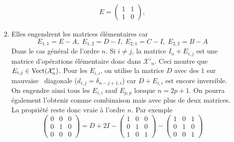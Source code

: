 \begin{enumerate}
\begin{enumerate}
\begin{multline*}
E=
\begin{pmatrix}
1 & 1 \\ 1 & 0  
\end{pmatrix},
\end{multline*}
  \item Elles engendrent les matrices élémentaires car
\begin{displaymath}
E_{1,1}=E-A, \;E_{1,2}=D-I, \;E_{2,1}=C-I, \;E_{2,2}=B-A   
\end{displaymath}
Dans le cas général de l'ordre $n$. Si $i\neq j$, la matrice $I_n + E_{i,j}$ est une matrice d'opérations élémentaire donc dans $\mathcal{X}'_n$. Ceci montre que $E_{i,j}\in \operatorname{Vect}(\mathcal{X}'_n)$.
Pour les $E_{i,i}$, on utilise la matrice $D$ avec des $1$ sur \og mauvaise\fg~ diagonale ($d_{i,j}=\delta _{n-j+1,i}$) car $D+E_{i,i}$ est encore inversible. On engendre ainsi tous les $E_{i,i}$ sauf $E_{p,p}$ lorsque $n=2p+1$. On pourra également l'obtenir comme combinaison mais avec plus de deux matrices. La propriété reste donc vraie à l'ordre $n$. Par exemple
\begin{displaymath}
\begin{pmatrix}
 0 & 0 & 0 \\ 0 & 1 & 0 \\ 0 & 0 & 0 
\end{pmatrix} = 
D + 2I 
-\begin{pmatrix}
1 & 0 & 0 \\ 0 & 1 & 0 \\ 1 & 0 & 1   
\end{pmatrix}
-\begin{pmatrix}
1 & 0 & 1 \\ 0 & 1 & 0 \\ 0 & 0 & 1   
\end{pmatrix}
\end{displaymath}

\end{enumerate}
\end{enumerate}

